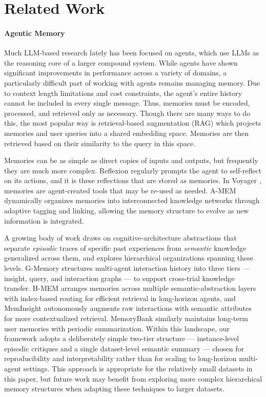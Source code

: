 \section{Related Work}
\label{sec:related}

\paragraph{Agentic Memory}
Much LLM-based research lately has been focused on agents, which use LLMs as the reasoning core of a larger compound system. While agents have shown significant improvements in performance across a variety of domains, a particularly difficult part of working with agents remains managing memory. Due to context length limitations and cost constraints, the agent's entire history cannot be included in every single message. Thus, memories must be encoded, processed, and retrieved only as necessary. Though there are many ways to do this, the most popular way is retrieval-based augmentation (RAG) which projects memories and user queries into a shared embedding space. Memories are then retrieved based on their similarity to the query in this space.

Memories can be as simple as direct copies of inputs and outputs, but frequently they are much more complex. Reflexion \citep{NEURIPS2023_1b44b878} regularly prompts the agent to self-reflect on its actions, and it is these reflections that are stored as memories. In Voyager \citep{Voyager}, memories are agent-created tools that may be re-used as needed. A-MEM \citep{xu2025amem} dynamically organizes memories into interconnected knowledge networks through adaptive tagging and linking, allowing the memory structure to evolve as new information is integrated.

A growing body of work draws on cognitive-architecture abstractions \citep{sumers2024cognitive,huet2025episodic} that separate \emph{episodic} traces of specific past experiences from \emph{semantic} knowledge generalized across them, and explores hierarchical organizations spanning these levels. G-Memory \citep{zhang2025gmemory} structures multi-agent interaction history into three tiers --- insight, query, and interaction graphs --- to support cross-trial knowledge transfer. H-MEM \citep{sun2025hmem} arranges memories across multiple semantic-abstraction layers with index-based routing for efficient retrieval in long-horizon agents, and MemInsight \citep{salama-etal-2025-meminsight} autonomously augments raw interactions with semantic attributes for more contextualized retrieval. MemoryBank \citep{Zhong_Guo_Gao_Ye_Wang_2024} similarly maintains long-term user memories with periodic summarization. Within this landscape, our framework adopts a deliberately simple two-tier structure --- instance-level episodic critiques and a single dataset-level semantic summary --- chosen for reproducibility and interpretability rather than for scaling to long-horizon multi-agent settings. This approach is appropriate for the relatively small datasets in this paper, but future work may benefit from exploring more complex hierarchical memory structures when adapting these techniques to larger datasets.

